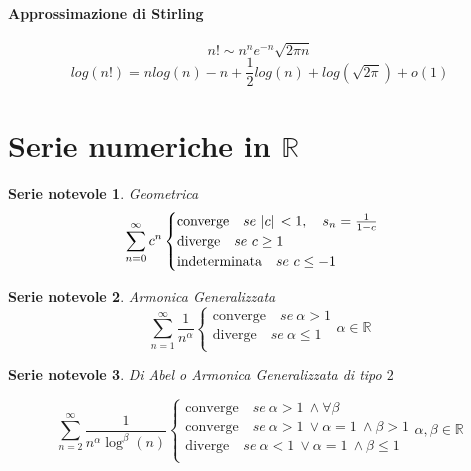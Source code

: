 \documentclass[a4paper, titlepage]{report}%
\theoremstyle{definition} %
\theoremstyle{plain}
\theoremstyle{plain}
\theoremstyle{remark}
\theoremstyle{remark}
\theoremstyle{plain}
\theoremstyle{plain}
\newtheorem*{serie}{Serie notevole}
\theoremstyle{plain}
\theoremstyle{plain}
\theoremstyle{plain}
\begin{document}
\paragraph*{Approssimazione di Stirling}
\[
     n! \sim n^n e^{-n} \sqrt{2 \pi n}    
\]
\[
       log(n!) = nlog(n) -n + \frac{1}{2} log(n) + log(\sqrt{2 \pi}) + o(1)
\]




\section*{Serie numeriche in $\mathbb{R}$}

\begin{serie}{Geometrica}
\[
        \sum_{n=0}^{\infty}c^n
        \begin{cases}
            \text{converge} \quad se \ \abs*{c}<1 ,
            \quad s_n= \frac{1}{1-c}\\
            \text{diverge}  \quad  se \ c \geq  1 \\
            \text{indeterminata} \quad se \ c \leq -1 \\
        \end{cases}   
\]
\end{serie}
\begin{serie}{Armonica Generalizzata}
\[
            \sum_{n=1}^{\infty} \frac{1}{n^{\alpha}}
            \begin{cases}
                \text{converge} \quad se \ \alpha > 1 \\
                \text{diverge}  \quad  se \ \alpha \leq  1 \\
            \end{cases}  
            \alpha \in \mathbb{R}  
\]
\end{serie}
\begin{serie}{Di Abel o Armonica Generalizzata di tipo $2$}

\[
    \sum_{n=2}^{\infty} \frac{1}{n^{\alpha}\log^{\beta}(n)}
    \begin{cases}
        \text{converge} \quad se \ \alpha > 1 \ \land \forall \beta \\
        \text{converge} \quad se \ \alpha > 1 \ \lor
        \alpha = 1 \ \land \beta > 1 \\
        \text{diverge}  \quad  se \ \alpha < 1 \ \lor \alpha = 1
        \ \land \beta \leq 1  \\
    \end{cases} 
    \alpha,\beta \in \mathbb{R} 
\]

\end{serie}
\end{document}
